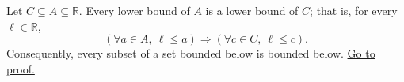 \begin{lemma}
\label{lem:subsets-preserve-lower-bounds}
Let $C\subseteq A\subseteq\mathbb{R}$. Every lower bound of $A$ is a
lower bound of $C$; that is, for every $\ell\in\mathbb{R}$,
\[
\left(\forall a\in A,\ \ell\leq a\right)
\Longrightarrow
(\forall c\in C,\ \ell\leq c).
\]
Consequently, every subset of a set bounded below is bounded below.
\hyperref[prf:subsets-preserve-lower-bounds]{Go to proof.}
\end{lemma}